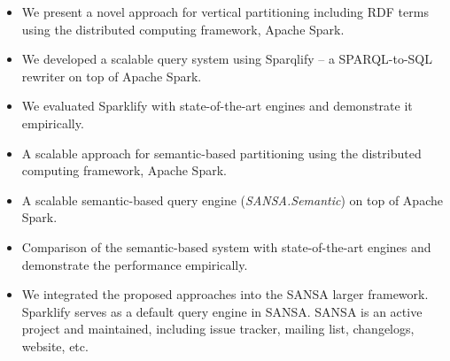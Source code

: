 \begin{itemize}
 \item We present a novel approach for vertical partitioning including \gls{RDF} terms using the distributed computing framework, Apache Spark.
 \item We developed a scalable query system using Sparqlify -- a SPARQL-to-SQL rewriter on top of Apache Spark.
 \item We evaluated Sparklify with state-of-the-art engines and demonstrate it empirically.
 \item A scalable approach for semantic-based partitioning using the distributed computing framework, Apache Spark.
 \item A scalable semantic-based query engine (\textit{SANSA.Semantic}) on top of Apache Spark.
 \item Comparison of the semantic-based system with state-of-the-art engines and demonstrate the performance empirically.
 \item We integrated the proposed approaches into the SANSA larger framework.
 Sparklify serves as a default query engine in SANSA.
 SANSA is an active project and maintained, including issue tracker, mailing list, changelogs, website, etc.
\end{itemize}





